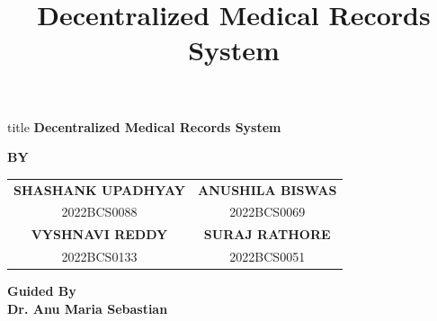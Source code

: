 \documentclass[10pt]{beamer}
\title{Decentralized Medical Records System}
\author{}
\institute{}
\date{}
\begin{document}
\begin{frame}
\vfill
\begin{center}
\hspace{2cm}
\begin{beamercolorbox}[rounded=true,shadow=true,wd=0.9\textwidth,center,dp=0.5ex,ht=3ex]{title}
{\Large \textbf{Decentralized Medical Records System}}
\end{beamercolorbox}

\vspace{0.8cm}

\textbf{BY}\\[0.5cm]
\begin{tabular}{cc}
\textbf{SHASHANK UPADHYAY} & \textbf{ANUSHILA BISWAS} \\
2022BCS0088 & 2022BCS0069 \\[0.3cm]
\textbf{VYSHNAVI REDDY} & \textbf{SURAJ RATHORE} \\
2022BCS0133 & 2022BCS0051
\end{tabular}

\vspace{0.8cm}

{\large \textbf{Guided By}}\\[0.2cm]
{\Large \textbf{Dr. Anu Maria Sebastian}}
\end{center}
\vfill
\end{frame}
\end{document}
